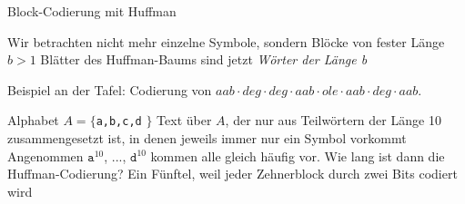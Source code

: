 \documentclass{beamer}
\begin{document}
\begin{frame}{Block-Codierung mit Huffman}
	\begin{itemize}
		\pitem Wir betrachten nicht mehr einzelne Symbole, sondern Blöcke von fester Länge $b > 1$
		\pitem Blätter des Huffman-Baums sind jetzt \textit{Wörter der Länge b}
	\end{itemize}

	\vspace{.5cm}
	
	Beispiel an der Tafel: Codierung von $aab\cdot deg \cdot deg \cdot aab \cdot ole \cdot aab \cdot deg \cdot aab$.\p
	
	\vspace{.5cm}
	
	\p
	\begin{itemize}
		\pitem Alphabet $A =\{$\texttt{a,b,c,d} $\}$
		\pitem Text über $A$, der nur aus Teilwörtern der Länge 10 zusammengesetzt ist, in denen jeweils immer nur ein Symbol vorkommt
		\pitem Angenommen $\texttt{a}^{10}$, ..., $\texttt{d}^{10}$ kommen alle gleich häufig vor. Wie lang ist dann die Huffman-Codierung? \pause
		\pitem[$\rightarrow$] Ein Fünftel, weil jeder Zehnerblock durch zwei Bits codiert wird
	\end{itemize}
	
\end{frame}


\end{document}

